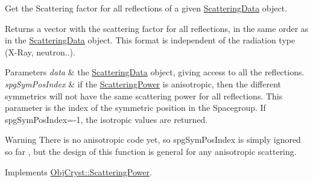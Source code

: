 Get the Scattering factor for all reflections of a given \mbox{\hyperlink{class_obj_cryst_1_1_scattering_data}{Scattering\+Data}} object. 

\begin{DoxyReturn}{Returns}
a vector with the scattering factor for all reflections, in the same order as in the \mbox{\hyperlink{class_obj_cryst_1_1_scattering_data}{Scattering\+Data}} object. This format is independent of the radiation type (X-\/\+Ray, neutron..). 
\end{DoxyReturn}

\begin{DoxyParams}{Parameters}
{\em data} & the \mbox{\hyperlink{class_obj_cryst_1_1_scattering_data}{Scattering\+Data}} object, giving access to all the reflections. \\
\hline
{\em spg\+Sym\+Pos\+Index} & if the \mbox{\hyperlink{class_obj_cryst_1_1_scattering_power}{Scattering\+Power}} is anisotropic, then the different symmetrics will not have the same scattering power for all reflections. This parameter is the index of the symmetric position in the Spacegroup. If spg\+Sym\+Pos\+Index=-\/1, the isotropic values are returned. \\
\hline
\end{DoxyParams}
\begin{DoxyWarning}{Warning}
There is no anisotropic code yet, so spg\+Sym\+Pos\+Index is simply ignored so far , but the design of this function is general for any anisotropic scattering. 
\end{DoxyWarning}


Implements \mbox{\hyperlink{class_obj_cryst_1_1_scattering_power_af18f3eaaf45af87bc3a2a0ff21bc34b6}{Obj\+Cryst\+::\+Scattering\+Power}}.

